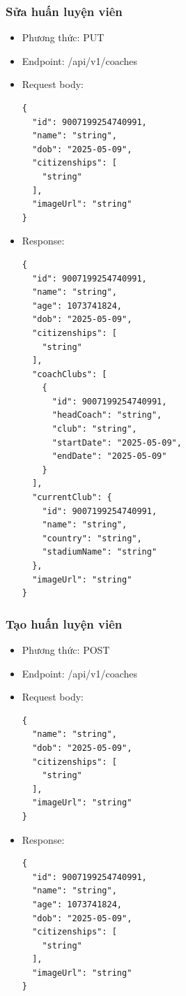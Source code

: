\documentclass[../BTL.tex]{subfiles}
\begin{document}
\subsubsection{ Sửa huấn luyện viên}
\begin{itemize}
    \item Phương thức: PUT
    \item Endpoint: /api/v1/coaches
    \item Request body:
        \begin{verbatim}
{
  "id": 9007199254740991,
  "name": "string",
  "dob": "2025-05-09",
  "citizenships": [
    "string"
  ],
  "imageUrl": "string"
}
        \end{verbatim}
    \item Response:
        \begin{verbatim}
{
  "id": 9007199254740991,
  "name": "string",
  "age": 1073741824,
  "dob": "2025-05-09",
  "citizenships": [
    "string"
  ],
  "coachClubs": [
    {
      "id": 9007199254740991,
      "headCoach": "string",
      "club": "string",
      "startDate": "2025-05-09",
      "endDate": "2025-05-09"
    }
  ],
  "currentClub": {
    "id": 9007199254740991,
    "name": "string",
    "country": "string",
    "stadiumName": "string"
  },
  "imageUrl": "string"
}
        \end{verbatim}
\end{itemize}

\subsubsection{ Tạo huấn luyện viên}
\begin{itemize}
    \item Phương thức: POST
    \item Endpoint: /api/v1/coaches
    \item Request body:
        \begin{verbatim}
{
  "name": "string",
  "dob": "2025-05-09",
  "citizenships": [
    "string"
  ],
  "imageUrl": "string"
}
        \end{verbatim}
    \item Response:
        \begin{verbatim}
{
  "id": 9007199254740991,
  "name": "string",
  "age": 1073741824,
  "dob": "2025-05-09",
  "citizenships": [
    "string"
  ],
  "imageUrl": "string"
}
        \end{verbatim}
\end{itemize}
\end{document}

